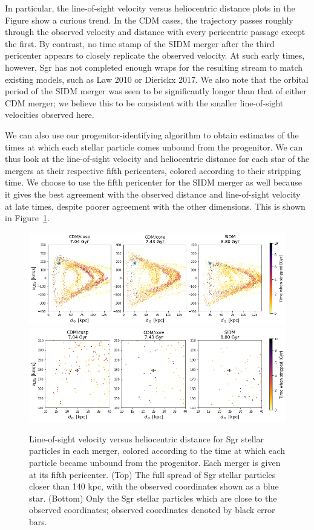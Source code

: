 In particular, the line-of-sight velocity versus heliocentric distance plots
in the Figure show a curious trend.  In the CDM cases, the trajectory passes
roughly through the observed velocity and distance with every pericentric
passage except the first.  By contrast, no time stamp of the SIDM merger after
the third pericenter appears to closely replicate the observed velocity.  At
such early times, however, Sgr has not completed enough wraps for the resulting
stream to match existing models, such as Law 2010 or Dierickx 2017.  We also
note that the orbital period of the SIDM merger was seen to be significantly
longer than that of either CDM merger; we believe this to be consistent with
the smaller line-of-sight velocities observed here.

We can also use our progenitor-identifying algorithm to obtain estimates of the
times at which each stellar particle comes unbound from the progenitor. We can
thus look at the line-of-sight velocity and heliocentric distance for each star
of the mergers at their respective fifth pericenters, colored according to their
stripping time. We choose to use the fifth pericenter for the SIDM merger as
well because it gives the best agreement with the observed distance and
line-of-sight velocity at late times, despite poorer agreement with the other
dimensions.  This is shown in Figure~\ref{fig:vel_v_dist}.

\begin{figure}
    \centering
    \includegraphics[width=1.0\linewidth]{figs/vel_v_dist_peri_only.png}
    \includegraphics[width=1.0\linewidth]{figs/vel_v_dist_zoomed.png}
    \caption{%
        Line-of-sight velocity versus heliocentric distance for Sgr stellar
        particles in each merger, colored according to the time at which each
        particle became unbound from the progenitor. Each merger is given at its
        fifth pericenter. (Top) The full spread of Sgr stellar particles closer
        than 140 kpc, with the observed coordinates shown as a blue star.
        (Bottom) Only the Sgr stellar particles which are close to the observed
        coordinates; observed coordinates denoted by black error bars.
    }
    \label{fig:vel_v_dist}
\end{figure}

